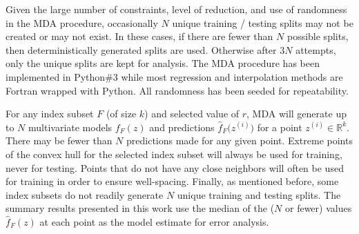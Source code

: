 \documentclass{scspaperproc}
\theoremstyle{scsthe}
\begin{document}
Given the large number of constraints, level of reduction, and use of
randomness in the MDA procedure, occasionally $N$ unique training /
testing splits may not be created or may not exist. In these cases, if
there are fewer than $N$ possible splits, then deterministically
generated splits are used. Otherwise after $3N$ attempts, only the
unique splits are kept for analysis. The MDA procedure has been
implemented in Python\#3 while most regression and interpolation
methods are Fortran wrapped with Python. All randomness has been
seeded for repeatability.

For any index subset $F$ (of size $k$) and selected value of $r$, MDA
will generate up to $N$ multivariate models $f_F(z)$ and predictions
$\hat{f}_F\big(z^{(i)}\big)$ for a point $z^{(i)} \in \mathbb{R}^k$.
There may be fewer than $N$ predictions made for any given
point. Extreme points of the convex hull for the selected index subset
will always be used for training, never for testing. Points that do
not have any close neighbors will often be used for training in order
to ensure well-spacing. Finally, as mentioned before, some index
subsets do not readily generate $N$ unique training and testing
splits. The summary results presented in this work use the median of
the ($N$ or fewer) values $\hat{f}_F(z)$ at each point as the model
estimate for error analysis.



\end{document}
